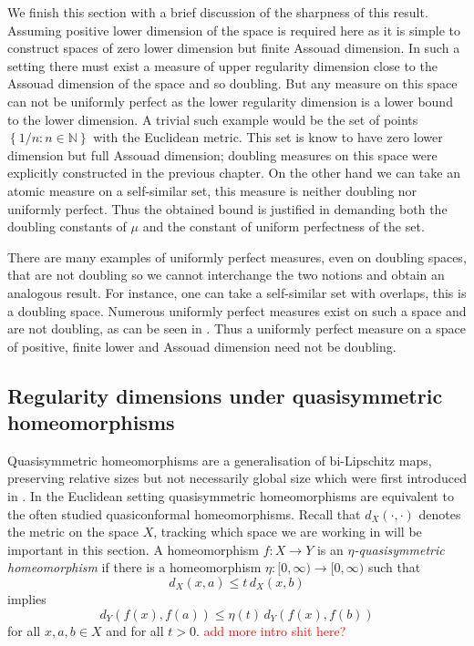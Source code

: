 We finish this section with a brief discussion of the sharpness of this result. Assuming positive lower dimension of the space is required here as it is simple to construct spaces of zero lower dimension but finite Assouad dimension. In such a setting there must exist a measure of upper regularity dimension close to the Assouad dimension of the space and so doubling. But any measure on this space can not be uniformly perfect as the lower regularity dimension is a lower bound to the lower dimension. A trivial such example would be the set of points $\left\{ 1/n : n \in \mathbb{N} \right\}$ with the Euclidean metric. This set is know to have zero lower dimension but full Assouad dimension; doubling measures on this space were explicitly constructed in the previous chapter. On the other hand we can take an atomic measure on a self-similar set, this measure is neither doubling nor uniformly perfect. Thus the obtained bound is justified in demanding both the doubling constants of $\mu$ and the constant of uniform perfectness of the set.

There are many examples of uniformly perfect measures, even on doubling spaces, that are not doubling so we cannot interchange the two notions and obtain an analogous result.  For instance, one can take a self-similar set with overlaps, this is a doubling space. Numerous uniformly perfect measures exist on such a space and are not doubling, as can be seen in \cite{hare-trosch}. Thus a uniformly perfect measure on a space of positive, finite lower and Assouad dimension need not be doubling.




\subsection{Regularity dimensions under quasisymmetric homeomorphisms}


Quasisymmetric homeomorphisms are a generalisation of bi-Lipschitz maps, preserving relative sizes but not necessarily global size which were first introduced in \cite{ahlfors-beurling,  tukia-vaisala}. In the Euclidean setting quasisymmetric homeomorphisms are equivalent to the often studied quasiconformal homeomorphisms. Recall that $d_X(\cdot,\cdot)$ denotes the metric on the space $X$, tracking which space we are working in will be important in this section. A homeomorphism $f\colon X \rightarrow Y$ is an \textit{$\eta$-quasisymmetric homeomorphism} if there is a homeomorphism $\eta \colon [0,\infty) \rightarrow [0,\infty)$ such that 
\[
d_X( x , a ) \le t \, d_X( x , b )
\]
implies 
\[
d_Y( f(x) , f(a) ) \le \eta(t) \, d_Y ( f(x) , f(b) )
\]
for all $x,a,b \in X$ and for all $t>0$.
\textcolor{red}{add more intro shit here?}

